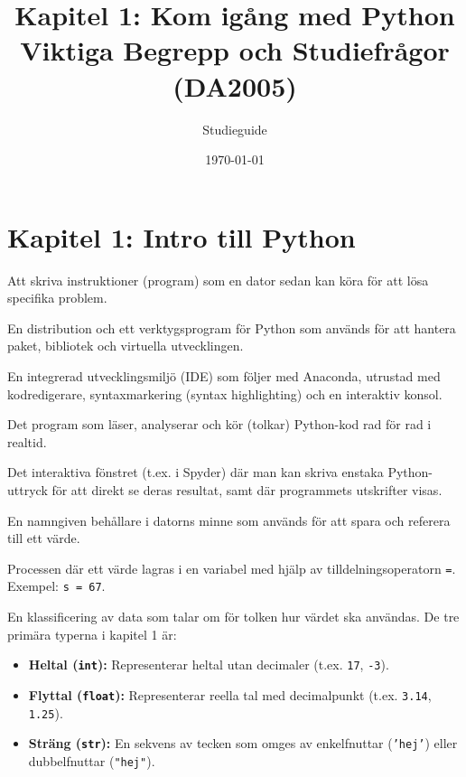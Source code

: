 \documentclass[11pt,a4paper]{article}
\title{\bfseries\color{primary}Kapitel 1: Kom igång med Python\\ \large Viktiga Begrepp och Studiefrågor (DA2005)}
\author{Studieguide}
\date{\today}
\begin{document}
\maketitle

\section{Kapitel 1: Intro till Python}

\begin{description}[style=nextline, leftmargin=1cm, labelindent=0.5cm]
    \item[\color{primary}Programmering] Att skriva instruktioner (program) som en dator sedan kan köra för att lösa specifika problem.
    \item[\color{primary}Anaconda] En distribution och ett verktygsprogram för Python som används för att hantera paket, bibliotek och virtuella utvecklingen.
    \item[\color{primary}Spyder] En integrerad utvecklingsmiljö (IDE) som följer med Anaconda, utrustad med kodredigerare, syntaxmarkering (syntax highlighting) och en interaktiv konsol.
    \item[\color{primary}Python-tolk (Interpreter)] Det program som läser, analyserar och kör (tolkar) Python-kod rad för rad i realtid.
    \item[\color{primary}Konsol (Console)] Det interaktiva fönstret (t.ex. i Spyder) där man kan skriva enstaka Python-uttryck för att direkt se deras resultat, samt där programmets utskrifter visas.
    \item[\color{primary}Variabel] En namngiven behållare i datorns minne som används för att spara och referera till ett värde.
    \item[\color{primary}Tilldelning (Assignment)] Processen där ett värde lagras i en variabel med hjälp av tilldelningsoperatorn \texttt{=}. Exempel: \texttt{s = 67}.
    \item[\color{primary}Datatyp] En klassificering av data som talar om för tolken hur värdet ska användas. De tre primära typerna i kapitel 1 är:
    \begin{itemize}
        \item \textbf{Heltal (\texttt{int}):} Representerar heltal utan decimaler (t.ex. \texttt{17}, \texttt{-3}).
        \item \textbf{Flyttal (\texttt{float}):} Representerar reella tal med decimalpunkt (t.ex. \texttt{3.14}, \texttt{1.25}).
        \item \textbf{Sträng (\texttt{str}):} En sekvens av tecken som omges av enkelfnuttar (\texttt{'hej'}) eller dubbelfnuttar (\texttt{"hej"}).

\end{itemize}
\end{description}
\end{document}
